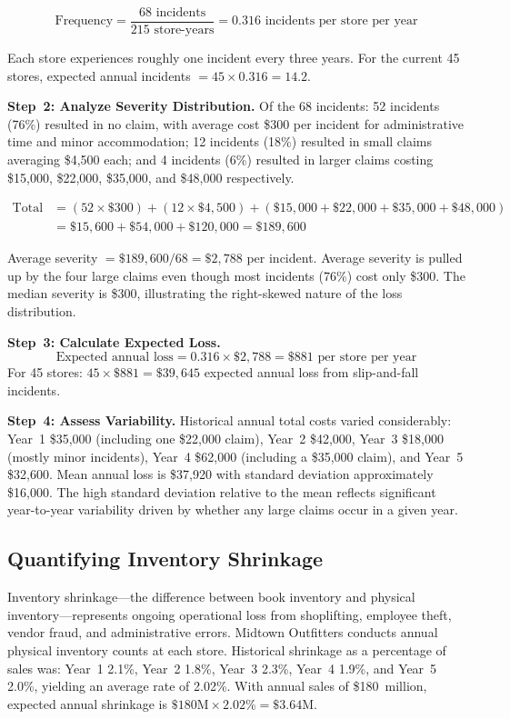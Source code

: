 \documentclass[11pt,openany]{book}
\begin{document}
\[
  \text{Frequency} = \frac{68 \text{ incidents}}{215 \text{ store-years}}
  = 0.316 \text{ incidents per store per year}
\]

Each store experiences roughly one incident every three years. For the current
45 stores, expected annual incidents \(= 45 \times 0.316 = 14.2\).

\textbf{Step~2: Analyze Severity Distribution.} Of the 68 incidents: 52
incidents (76\%) resulted in no claim, with average cost \$300 per incident
for administrative time and minor accommodation; 12 incidents (18\%) resulted
in small claims averaging \$4,500 each; and 4 incidents (6\%) resulted in
larger claims costing \$15,000, \$22,000, \$35,000, and \$48,000 respectively.

\begin{align*}
  \text{Total costs} &= (52 \times \$300) + (12 \times \$4{,}500)
                       + (\$15{,}000 + \$22{,}000 + \$35{,}000 + \$48{,}000)\\
                     &= \$15{,}600 + \$54{,}000 + \$120{,}000 = \$189{,}600
\end{align*}

Average severity \(= \$189{,}600 / 68 = \$2{,}788\) per incident. Average
severity is pulled up by the four large claims even though most incidents
(76\%) cost only \$300. The median severity is \$300, illustrating the
right-skewed nature of the loss distribution.

\textbf{Step~3: Calculate Expected Loss.}
\[
  \text{Expected annual loss} = 0.316 \times \$2{,}788 = \$881 \text{ per store per year}
\]
For 45 stores: \(45 \times \$881 = \$39{,}645\) expected annual loss from
slip-and-fall incidents.

\textbf{Step~4: Assess Variability.} Historical annual total costs varied
considerably: Year~1 \$35,000 (including one \$22,000 claim), Year~2 \$42,000,
Year~3 \$18,000 (mostly minor incidents), Year~4 \$62,000 (including a \$35,000
claim), and Year~5 \$32,600. Mean annual loss is \$37,920 with standard
deviation approximately \$16,000. The high standard deviation relative to the
mean reflects significant year-to-year variability driven by whether any large
claims occur in a given year.

\subsection{Quantifying Inventory Shrinkage}
\label{subsec:midtown-shrinkage}

Inventory shrinkage---the difference between book inventory and physical
inventory---represents ongoing operational loss from shoplifting, employee
theft, vendor fraud, and administrative errors. Midtown Outfitters conducts
annual physical inventory counts at each store. Historical shrinkage as a
percentage of sales was: Year~1 2.1\%, Year~2 1.8\%, Year~3 2.3\%, Year~4
1.9\%, and Year~5 2.0\%, yielding an average rate of 2.02\%. With annual sales
of \$180~million, expected annual shrinkage is \(\$180\text{M} \times 2.02\% =
\$3.64\text{M}\).
\end{document}
